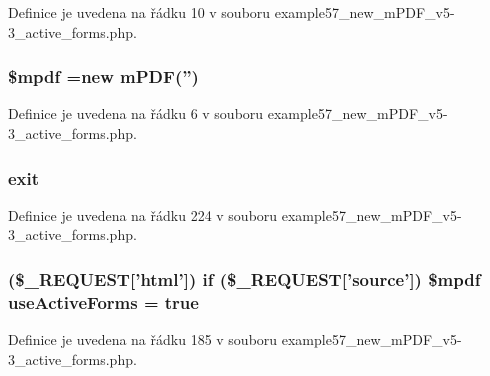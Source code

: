 Definice je uvedena na řádku 10 v souboru example57\-\_\-new\-\_\-m\-P\-D\-F\-\_\-v5-\/3\-\_\-active\-\_\-forms.\-php.

\hypertarget{example57__new__m_p_d_f__v5-3__active__forms_8php_ad028f81910d6cbab9b184d2214b3a8f8}{
\subsubsection[{\$mpdf}]{\setlength{\rightskip}{0pt plus 5cm}\$mpdf =new {\bf m\-P\-D\-F}('')}}\label{example57__new__m_p_d_f__v5-3__active__forms_8php_ad028f81910d6cbab9b184d2214b3a8f8}


Definice je uvedena na řádku 6 v souboru example57\-\_\-new\-\_\-m\-P\-D\-F\-\_\-v5-\/3\-\_\-active\-\_\-forms.\-php.

\hypertarget{example57__new__m_p_d_f__v5-3__active__forms_8php_a6733eb5f605d09eaede9845835d71c4e}{
\subsubsection[{exit}]{\setlength{\rightskip}{0pt plus 5cm}exit}}\label{example57__new__m_p_d_f__v5-3__active__forms_8php_a6733eb5f605d09eaede9845835d71c4e}


Definice je uvedena na řádku 224 v souboru example57\-\_\-new\-\_\-m\-P\-D\-F\-\_\-v5-\/3\-\_\-active\-\_\-forms.\-php.

\hypertarget{example57__new__m_p_d_f__v5-3__active__forms_8php_a378161bd0fa26b3dc46a75ac7aa2671b}{
\subsubsection[{use\-Active\-Forms}]{ (\$\-\_\-\-R\-E\-Q\-U\-E\-S\-T\mbox{[}'html'\mbox{]}) {\bf if} (\$\-\_\-\-R\-E\-Q\-U\-E\-S\-T\mbox{[}'source'\mbox{]}) \$mpdf use\-Active\-Forms = true}}\label{example57__new__m_p_d_f__v5-3__active__forms_8php_a378161bd0fa26b3dc46a75ac7aa2671b}


Definice je uvedena na řádku 185 v souboru example57\-\_\-new\-\_\-m\-P\-D\-F\-\_\-v5-\/3\-\_\-active\-\_\-forms.\-php.

